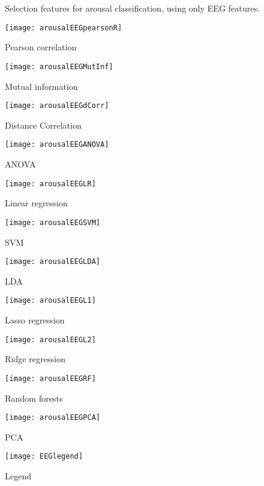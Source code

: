 \clearpage
\begin{figure}[!tbp]
  \centering
  \caption{Selection features for arousal classification, using only EEG features.\label{arousalEEGpies}}
  \begin{minipage}[b]{0.3\textwidth}
    \texttt{[image: arousalEEGpearsonR]}
    \caption{Pearson correlation}
  \end{minipage}
  \hfill
  \begin{minipage}[b]{0.3\textwidth}
    \texttt{[image: arousalEEGMutInf]}
    \caption{Mutual information}
  \end{minipage}
  \hfill
  \begin{minipage}[b]{0.3\textwidth}
    \texttt{[image: arousalEEGdCorr]}
    \caption{Distance Correlation}
  \end{minipage}
  
  \begin{minipage}[b]{0.3\textwidth}
    \texttt{[image: arousalEEGANOVA]}
    \caption{ANOVA}
  \end{minipage}
  \hfill
  \begin{minipage}[b]{0.3\textwidth}
    \texttt{[image: arousalEEGLR]}
    \caption{Linear regression}
  \end{minipage}
  \hfill
  \begin{minipage}[b]{0.3\textwidth}
    \texttt{[image: arousalEEGSVM]}
    \caption{SVM}
  \end{minipage}
  
  \begin{minipage}[b]{0.3\textwidth}
    \texttt{[image: arousalEEGLDA]}
    \caption{LDA}
  \end{minipage}
  \hfill
  \begin{minipage}[b]{0.3\textwidth}
    \texttt{[image: arousalEEGL1]}
    \caption{Lasso regression}
  \end{minipage}
  \hfill
  \begin{minipage}[b]{0.3\textwidth}
    \texttt{[image: arousalEEGL2]}
    \caption{Ridge regression}
  \end{minipage}
  
  \begin{minipage}[b]{0.3\textwidth}
    \texttt{[image: arousalEEGRF]}
    \caption{Random forests}
  \end{minipage}
  \hfill
  \begin{minipage}[b]{0.3\textwidth}
    \texttt{[image: arousalEEGPCA]} %
    \caption{PCA}
  \end{minipage}
  \hfill
  \begin{minipage}[b]{0.3\textwidth}
    \texttt{[image: EEGlegend]}
    \caption{Legend\label{arousalpieslegend}}
  \end{minipage}
\end{figure}

